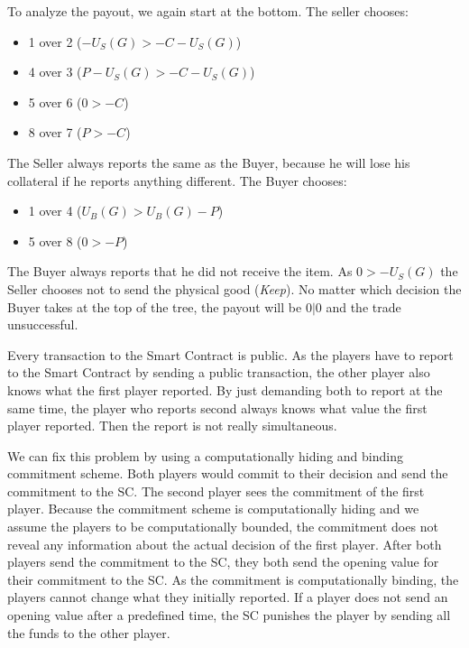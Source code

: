 \documentclass{cacthesis}
\begin{document}
To analyze the payout, we again start at the bottom. The seller chooses:
\begin{itemize}
    \item 1 over 2 ($-U_S(G)>-C - U_S(G)$)
    \item 4 over 3 ($P-U_S(G)> -C-U_S(G)$)
    \item 5 over 6 ($0 > -C$)
    \item 8 over 7 ($P > -C$)
\end{itemize}
The Seller always reports the same as the Buyer, because he will lose his collateral if he reports anything different.\newline
The Buyer chooses:
\begin{itemize}
    \item 1 over 4 ($U_B(G)>U_B(G) - P$)
    \item 5 over 8 ($0>-P$)
\end{itemize}
The Buyer always reports that he did not receive the item.\newline
As $0 > -U_S(G)$ the Seller chooses not to send the physical good (\emph{Keep}).\newline
No matter which decision the Buyer takes at the top of the tree, the payout will be $0|0$ and the trade unsuccessful.


 Every transaction to the Smart Contract is public. As the players have to
 report to the Smart Contract by sending a public transaction, the other player
 also knows what the first player reported. By just demanding both to report at
 the same time, the player who reports second always knows what value the first player reported. Then the report is not really simultaneous.\newline

 We can fix this problem by using a computationally hiding and binding commitment scheme. Both players would commit to their decision and send the commitment to the SC. The second player sees the commitment of the first player. Because the commitment scheme is computationally hiding and we assume the players to be computationally bounded, the commitment does not reveal any information about the actual decision of the first player.
 After both players send the commitment to the SC, they both send the opening
 value for their commitment to the SC. As the commitment is computationally
 binding, the players cannot change what they initially reported. If a player
 does not send an opening value after a predefined time, the SC punishes the
 player by sending all the funds to the other player.
\end{document}
